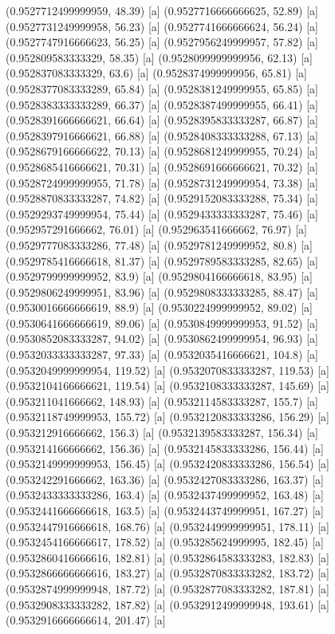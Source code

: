 {{{(0.9527712499999959, 48.39) [a] 
(0.9527716666666625, 52.89) [a] 
(0.9527731249999958, 56.23) [a] 
(0.9527741666666624, 56.24) [a] 
(0.9527747916666623, 56.25) [a] 
(0.9527956249999957, 57.82) [a] 
(0.952809583333329, 58.35) [a] 
(0.9528099999999956, 62.13) [a] 
(0.952837083333329, 63.6) [a] 
(0.9528374999999956, 65.81) [a] 
(0.9528377083333289, 65.84) [a] 
(0.9528381249999955, 65.85) [a] 
(0.9528383333333289, 66.37) [a] 
(0.9528387499999955, 66.41) [a] 
(0.9528391666666621, 66.64) [a] 
(0.9528395833333287, 66.87) [a] 
(0.9528397916666621, 66.88) [a] 
(0.9528408333333288, 67.13) [a] 
(0.9528679166666622, 70.13) [a] 
(0.9528681249999955, 70.24) [a] 
(0.9528685416666621, 70.31) [a] 
(0.9528691666666621, 70.32) [a] 
(0.9528724999999955, 71.78) [a] 
(0.9528731249999954, 73.38) [a] 
(0.9528870833333287, 74.82) [a] 
(0.9529152083333288, 75.34) [a] 
(0.9529293749999954, 75.44) [a] 
(0.9529433333333287, 75.46) [a] 
(0.952957291666662, 76.01) [a] 
(0.952963541666662, 76.97) [a] 
(0.9529777083333286, 77.48) [a] 
(0.9529781249999952, 80.8) [a] 
(0.9529785416666618, 81.37) [a] 
(0.9529789583333285, 82.65) [a] 
(0.9529799999999952, 83.9) [a] 
(0.9529804166666618, 83.95) [a] 
(0.9529806249999951, 83.96) [a] 
(0.9529808333333285, 88.47) [a] 
(0.9530016666666619, 88.9) [a] 
(0.9530224999999952, 89.02) [a] 
(0.9530641666666619, 89.06) [a] 
(0.9530849999999953, 91.52) [a] 
(0.9530852083333287, 94.02) [a] 
(0.9530862499999954, 96.93) [a] 
(0.9532033333333287, 97.33) [a] 
(0.9532035416666621, 104.8) [a] 
(0.9532049999999954, 119.52) [a] 
(0.9532070833333287, 119.53) [a] 
(0.9532104166666621, 119.54) [a] 
(0.9532108333333287, 145.69) [a] 
(0.953211041666662, 148.93) [a] 
(0.9532114583333287, 155.7) [a] 
(0.9532118749999953, 155.72) [a] 
(0.9532120833333286, 156.29) [a] 
(0.953212916666662, 156.3) [a] 
(0.9532139583333287, 156.34) [a] 
(0.953214166666662, 156.36) [a] 
(0.9532145833333286, 156.44) [a] 
(0.9532149999999953, 156.45) [a] 
(0.9532420833333286, 156.54) [a] 
(0.953242291666662, 163.36) [a] 
(0.9532427083333286, 163.37) [a] 
(0.9532433333333286, 163.4) [a] 
(0.9532437499999952, 163.48) [a] 
(0.9532441666666618, 163.5) [a] 
(0.9532443749999951, 167.27) [a] 
(0.9532447916666618, 168.76) [a] 
(0.9532449999999951, 178.11) [a] 
(0.9532454166666617, 178.52) [a] 
(0.953285624999995, 182.45) [a] 
(0.9532860416666616, 182.81) [a] 
(0.9532864583333283, 182.83) [a] 
(0.9532866666666616, 183.27) [a] 
(0.9532870833333282, 183.72) [a] 
(0.9532874999999948, 187.72) [a] 
(0.9532877083333282, 187.81) [a] 
(0.9532908333333282, 187.82) [a] 
(0.9532912499999948, 193.61) [a] 
(0.9532916666666614, 201.47) [a] 
}}}
